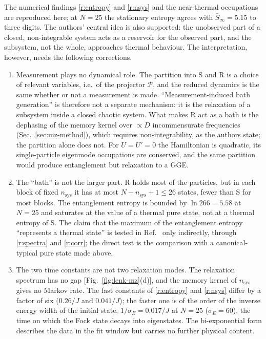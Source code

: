 \documentclass[10pt,a4paper]{article}
\newcommand{\PP}{\mathcal{P}}
\begin{document}
The numerical findings \ref{r:entropy} and \ref{r:nsys} and the near-thermal occupations are reproduced here; at $ N = 25 $ the stationary entropy agrees with $ \bar S_\infty = 5.15 $ to three digits.
The authors' central idea is also supported: the unobserved part of a closed, non-integrable system acts as a reservoir for the observed part, and the subsystem, not the whole, approaches thermal behaviour.
The interpretation, however, needs the following corrections.
\begin{enumerate}[label=(\alph*), leftmargin=2.2em]
\item Measurement plays no dynamical role. The partition into S and R is a choice of relevant variables, i.e.\ of the projector $ \PP $, and the reduced dynamics is the same whether or not a measurement is made. ``Measurement-induced bath generation'' is therefore not a separate mechanism: it is the relaxation of a subsystem inside a closed chaotic system. What makes R act as a bath is the dephasing of the memory kernel over $ \propto D $ incommensurate frequencies (Sec.~\ref{sec:mz-method}), which requires non-integrability, as the authors state; the partition alone does not. For $ U = U' = 0 $ the Hamiltonian is quadratic, its single-particle eigenmode occupations are conserved, and the same partition would produce entanglement but relaxation to a GGE.
\item The ``bath'' is not the larger part. R holds most of the particles, but in each block of fixed $ n_{\mathrm{sys}} $ it has at most $ N - n_{\mathrm{sys}} + 1 \le 26 $ states, fewer than S for most blocks. The entanglement entropy is bounded by $ \ln 266 = 5.58 $ at $ N = 25 $ and saturates at the value of a thermal pure state, not at a thermal entropy of S. The claim that the maximum of the entanglement entropy ``represents a thermal state'' is tested in Ref.~\cite{Lenk2025} only indirectly, through \ref{r:spectra} and \ref{r:corr}; the direct test is the comparison with a canonical-typical pure state made above.
\item The two time constants are not two relaxation modes. The relaxation spectrum has no gap [Fig.~\ref{fig:lenk-mz}(d)], and the memory kernel of $ n_{\mathrm{sys}} $ gives no Markov rate. The fast constants of \ref{r:entropy} and \ref{r:nsys} differ by a factor of six ($ 0.26/J $ and $ 0.041/J $); the faster one is of the order of the inverse energy width of the initial state, $ 1/\sigma_E = 0.017/J $ at $ N = 25 $ ($ \sigma_E = 60 $), the time on which the Fock state decays into eigenstates. The bi-exponential form describes the data in the fit window but carries no further physical content.

\end{enumerate}
\end{document}
